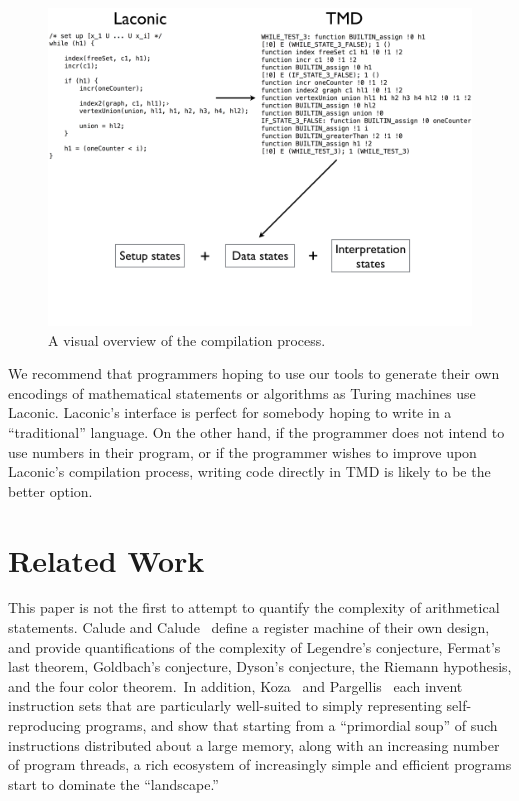 \documentclass[11pt]{article}
\begin{document}
\begin{figure} 
\begin{center} 
\includegraphics[scale=0.42]{figs/compilation.png}
\caption{A visual overview of the compilation process. \label{fig:compilation}} 
\end{center} 
\end{figure}

We recommend that programmers hoping to use our tools to generate their own encodings of mathematical statements or algorithms as Turing machines use Laconic. Laconic's interface is perfect for somebody hoping to write in a ``traditional'' language. On the other hand, if the programmer does not intend to use numbers in their program, or if the programmer wishes to improve upon Laconic's compilation process, writing code directly in TMD is likely to be the better option.

\section{Related Work}

This paper is not the first to attempt to quantify the complexity of arithmetical statements. Calude and Calude~\cite{calude} define a register machine of their own design, and provide quantifications of the complexity of Legendre's conjecture, Fermat's last theorem, Goldbach's conjecture, Dyson's conjecture, the Riemann hypothesis, and the four color theorem.\footnotemark~In addition, Koza~\cite{koza} and Pargellis~\cite{pargellis} each invent instruction sets that are particularly well-suited to simply representing self-reproducing programs, and show that starting from a ``primordial soup'' of such instructions distributed about a large memory, along with an increasing number of program threads, a rich ecosystem of increasingly simple and efficient programs start to dominate the ``landscape.'' 
\end{document}
